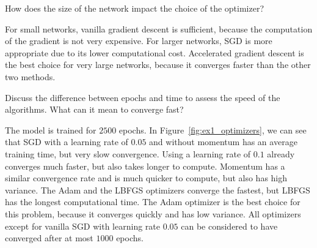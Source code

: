 \documentclass{article}
\newenvironment{task}[1]{
  \begin{tcolorbox}[
    colback=highlight!5!white,
    colframe=highlight,
    title={Task #1}
  ]
}{
  \end{tcolorbox}
}
\begin{document}
\begin{task}{1.3.3}
  How does the size of the network impact the choice of the optimizer?
\end{task}

For small networks, vanilla gradient descent is sufficient, because the computation of the gradient
is not very expensive. For larger networks, SGD is more appropriate due to its lower computational
cost. Accelerated gradient descent is the best choice for very large networks, because it converges
faster than the other two methods.


\begin{task}{1.3.4}
  Discuss the difference between epochs and time to assess the speed of the algorithms. What can it
  mean to converge fast?
\end{task}

The model is trained for $2500$ epochs. In Figure~\ref{fig:ex1_optimizers}, we can see that SGD with
a learning rate of $0.05$ and without momentum has an average training time, but very slow
convergence. Using a learning rate of $0.1$ already converges much faster, but also takes longer to
compute. Momentum has a similar convergence rate and is much quicker to compute, but also has high
variance. The Adam and the LBFGS optimizers converge the fastest, but LBFGS has the longest
computational time. The Adam optimizer is the best choice for this problem, because it converges
quickly and has low variance. All optimizers except for vanilla SGD with learning rate $0.05$ can
be considered to have converged after at most $1000$ epochs.
\end{document}
